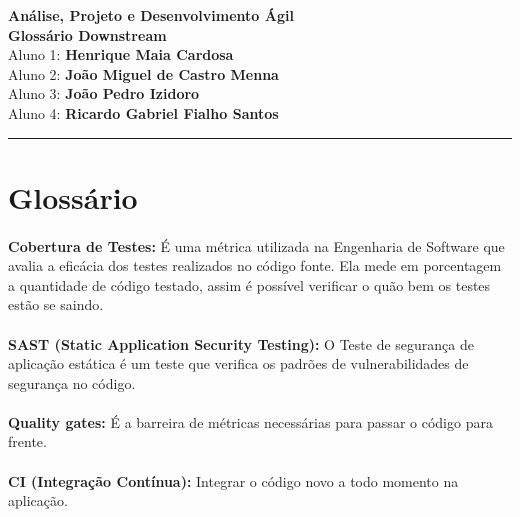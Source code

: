 \documentclass{article}
\begin{document}
\begin{center}
    \centering

    {\huge \textbf{Análise, Projeto e Desenvolvimento Ágil}}\\[0.5cm]

    {\Huge \textbf{Glossário Downstream}}\\[0.5cm]

    {\large Aluno 1: \textbf{Henrique Maia Cardosa}}\\[0.5cm]
    {\large Aluno 2: \textbf{João Miguel de Castro Menna}}\\[0.5cm]
    {\large Aluno 3: \textbf{João Pedro Izidoro}}\\[0.5cm]
    {\large Aluno 4: \textbf{Ricardo Gabriel Fialho Santos}}\\[0.5cm]
\end{center}

\vspace{1em}
\hrule
\vspace{1em}

\section*{Glossário}

\paragraph{}
\textbf{Cobertura de Testes:} É uma métrica utilizada na Engenharia de Software que avalia a eficácia dos testes realizados no código fonte. Ela mede em porcentagem a quantidade de código testado, assim é possível verificar o quão bem os testes estão se saindo.

\paragraph{}
\textbf{SAST (Static Application Security Testing):} O Teste de segurança de aplicação estática é um teste que verifica os padrões de  vulnerabilidades de segurança no código.

\paragraph{}
\textbf{Quality gates:} É a barreira de métricas necessárias para passar o código para frente.

\paragraph{}
\textbf{CI (Integração Contínua):} Integrar o código novo a todo momento na aplicação.
\end{document}

